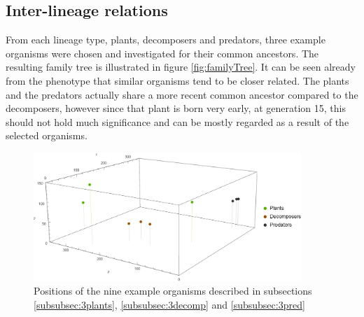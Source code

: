 \subsection{Inter-lineage relations}
From each lineage type, plants, decomposers and predators, three example organisms were chosen and investigated for their common ancestors. The resulting family tree is illustrated in figure \ref{fig:familyTree}. It can be seen already from the phenotype that similar organisms tend to be closer related. The plants and the predators actually share a more recent common ancestor compared to the decomposers, however since that plant is born very early, at generation 15, this should not hold much significance and can be mostly regarded as a result of the selected organisms.

\begin{figure}
  \begin{center}
  \includegraphics[width=0.9\textwidth]{figure/lineOrgPos}
  \caption{Positions of the nine example organisms described in subsections \ref{subsubsec:3plants}, \ref{subsubsec:3decomp} and \ref{subsubsec:3pred}}
  \label{fig:lineOrgPos}
  \end{center}
\end{figure}

